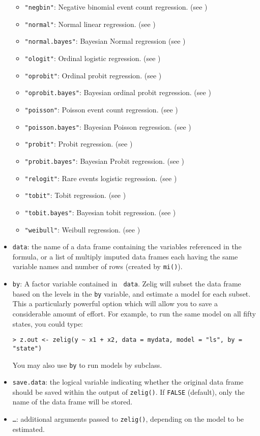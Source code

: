 \begin{itemize}
\begin{itemize}
    \item {\tt "negbin"}: Negative binomial event count regression.
      (see )
    \item {\tt "normal"}: Normal linear regression.  (see
      )
    \item {\tt "normal.bayes"}: Bayesian Normal regression (see )
    \item {\tt "ologit"}: Ordinal logistic regression.  (see
      )
    \item {\tt "oprobit"}: Ordinal probit regression.  (see
      )
    \item {\tt "oprobit.bayes"}: Bayesian ordinal probit regression.
(see )
    \item {\tt "poisson"}: Poisson event count regression.  (see
      )
    \item {\tt "poisson.bayes"}: Bayesian Poisson regression.  (see )
    \item {\tt "probit"}: Probit regression.  (see
      )
    \item {\tt "probit.bayes"}:  Bayesian Probit regression.  (see )
    \item {\tt "relogit"}: Rare events logistic regression.  (see
      )
    \item {\tt "tobit"}: Tobit regression.  (see )
    \item {\tt "tobit.bayes"}: Bayesian tobit regression.  (see )
    \item {\tt "weibull"}: Weibull regression.  (see
      )
  \end{itemize}
\item {\tt data}: the name of a data frame containing the variables
  referenced in the formula, or a list of multiply imputed data frames
  each having the same variable names and number of rows (created by
  {\tt mi()}).
\item {\tt by}: \label{by} A factor variable contained in {\tt
    data}.  Zelig will subset the data frame based on the levels in
  the {\tt by} variable, and estimate a model for each subset.  This a
  particularly powerful option which will allow you to save a
  considerable amount of effort.  For example, to run the same model
  on all fifty states, you could type:  
\begin{verbatim}
> z.out <- zelig(y ~ x1 + x2, data = mydata, model = "ls", by = "state")
\end{verbatim}
  You may also use {\tt by} to run models by
   subclass.
  
\item{\tt save.data}: the logical variable indicating whether the
  original data frame should be saved within the output of
  \texttt{zelig()}. If {\tt FALSE} (default), only the name of the
  data frame will be stored.

\item{\tt \dots}: additional arguments passed to \texttt{zelig()},
  depending on the model to be estimated.
\end{itemize}

